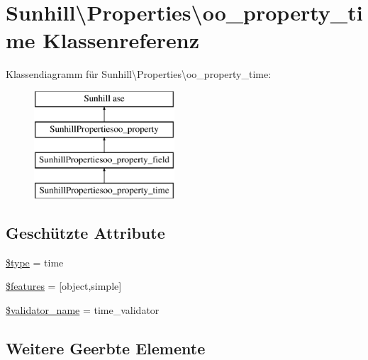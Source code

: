 \hypertarget{classSunhill_1_1Properties_1_1oo__property__time}{}\section{Sunhill\textbackslash{}Properties\textbackslash{}oo\+\_\+property\+\_\+time Klassenreferenz}
\label{classSunhill_1_1Properties_1_1oo__property__time}
Klassendiagramm für Sunhill\textbackslash{}Properties\textbackslash{}oo\+\_\+property\+\_\+time\+:\begin{figure}[H]
\begin{center}
\leavevmode
\includegraphics[height=4.000000cm]{db/d21/classSunhill_1_1Properties_1_1oo__property__time}
\end{center}
\end{figure}
\subsection*{Geschützte Attribute}
\begin{DoxyCompactItemize}
\item 
\hyperlink{classSunhill_1_1Properties_1_1oo__property__time_a1e4bb81a5e68306de8702b44ffc2c6da}{\$type} = \textquotesingle{}time\textquotesingle{}
\item 
\hyperlink{classSunhill_1_1Properties_1_1oo__property__time_a216c76c02ffc2586ee3bc54f6c990b13}{\$features} = \mbox{[}\textquotesingle{}object\textquotesingle{},\textquotesingle{}simple\textquotesingle{}\mbox{]}
\item 
\hyperlink{classSunhill_1_1Properties_1_1oo__property__time_aa2c941a20154a904dc6e703a85c535a6}{\$validator\+\_\+name} = \textquotesingle{}time\+\_\+validator\textquotesingle{}
\end{DoxyCompactItemize}
\subsection*{Weitere Geerbte Elemente}


